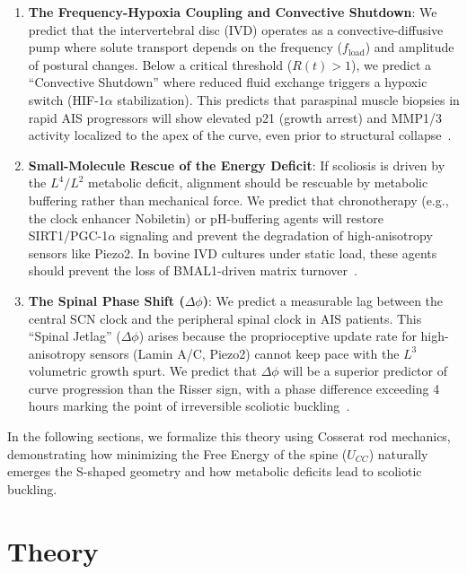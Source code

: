 \documentclass[11pt,a4paper]{article}
\newcommand{\InstabilityR}{R(t)}
\begin{document}
\begin{enumerate}
    \item \textbf{The Frequency-Hypoxia Coupling and Convective Shutdown}: We predict that the intervertebral disc (IVD) operates as a convective-diffusive pump where solute transport depends on the frequency ($f_{\mathrm{load}}$) and amplitude of postural changes. Below a critical threshold ($\InstabilityR > 1$), we predict a ``Convective Shutdown'' where reduced fluid exchange triggers a hypoxic switch (HIF-1$\alpha$ stabilization). This predicts that paraspinal muscle biopsies in rapid AIS progressors will show elevated p21 (growth arrest) and MMP1/3 activity localized to the apex of the curve, even prior to structural collapse~\cite{chen2025mmp, sato2025convective}.

    \item \textbf{Small-Molecule Rescue of the Energy Deficit}: If scoliosis is driven by the $L^4/L^2$ metabolic deficit, alignment should be rescuable by metabolic buffering rather than mechanical force. We predict that chronotherapy (e.g., the clock enhancer Nobiletin) or pH-buffering agents will restore SIRT1/PGC-1$\alpha$ signaling and prevent the degradation of high-anisotropy sensors like Piezo2. In bovine IVD cultures under static load, these agents should prevent the loss of BMAL1-driven matrix turnover~\cite{he2016nobiletin, yang2017circadian}.

    \item \textbf{The Spinal Phase Shift ($\Delta \phi$)}: We predict a measurable lag between the central SCN clock and the peripheral spinal clock in AIS patients. This ``Spinal Jetlag'' ($\Delta \phi$) arises because the proprioceptive update rate for high-anisotropy sensors (Lamin A/C, Piezo2) cannot keep pace with the $L^3$ volumetric growth spurt. We predict that $\Delta \phi$ will be a superior predictor of curve progression than the Risser sign, with a phase difference exceeding 4 hours marking the point of irreversible scoliotic buckling~\cite{dudek2017clock}.
\end{enumerate}

In the following sections, we formalize this theory using Cosserat rod mechanics, demonstrating how minimizing the Free Energy of the spine ($U_{CC}$) naturally emerges the S-shaped geometry and how metabolic deficits lead to scoliotic buckling.


\section{Theory}
\end{document}
